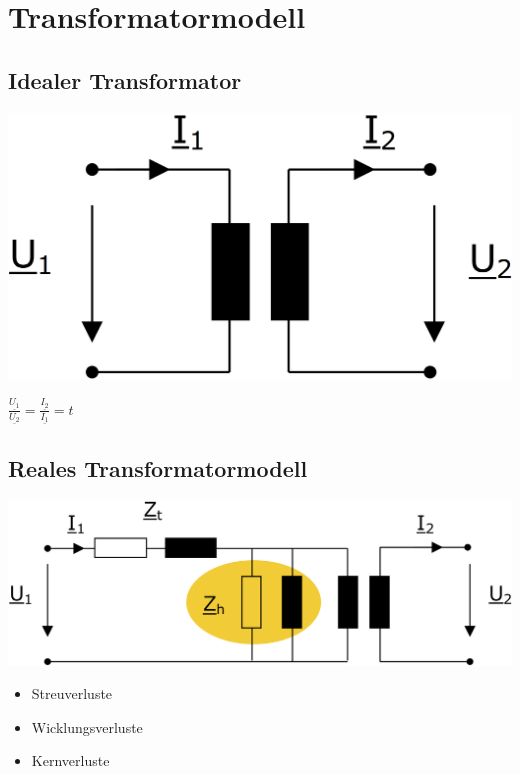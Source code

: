 \section{Transformatormodell}


\subsection{Idealer Transformator}

\begin{minipage}[t]{0.4\columnwidth}
    \includegraphics[width=0.8\columnwidth, align=c]{images/Idealer_Transformator_1.png}
\end{minipage}
\hfill
\begin{minipage}[t]{0.58\columnwidth}
    $
        \boxed{\frac{\underline{U_1}}{\underline{U_2}} = \frac{\underline{I_2}}{\underline{I_1}} = t}
    $
\end{minipage}



\subsection{Reales Transformatormodell}

\includegraphics[width=0.98\columnwidth, align=c]{images/Reales_Transformatorbild_1.png}

\vspace{0.15cm}

\begin{itemize}
    \item Streuverluste
    \item Wicklungsverluste
    \item Kernverluste
\end{itemize}


